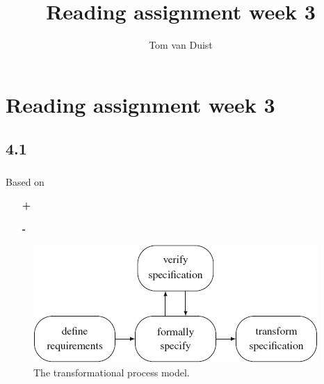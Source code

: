 

\title{Reading assignment week 3}
\newcommand{\TitelAbbr}{}
\newcommand{\Version}{0.1}



\what{}
\supervisors{}
\author{Tom van Duist}




\maketitle
\clearpage


\chapter*{Reading assignment week 3}

\section*{4.1}

\subsection*{ \cite{req_en_book}}
Based on 
\begin{itemize}
	\item[\textbf{+}] 
	\item[\textbf{-}] 
\end{itemize}
\begin{figure}[h]
	\centering
	\includegraphics[width=0.75\linewidth]{Resources/4_transformational.png}
	\caption{The transformational process model.}
	\label{fig:transformational}
\end{figure} 

\clearpage
